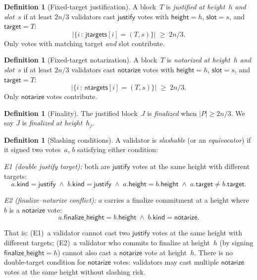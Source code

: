 \ifx\litemode\undefined\documentclass{article}\fi
\newcommand{\target}{\mathsf{target}}
\newcommand{\kind}{\mathsf{kind}}
\newcommand{\height}{\mathsf{height}}
\newcommand{\justify}{\mathsf{justify}}
\newcommand{\notarize}{\mathsf{notarize}}
\theoremstyle{plain}
\theoremstyle{definition}
\newtheorem{definition}[theorem]{Definition}
\theoremstyle{remark}
\begin{document}
\begin{definition}[Fixed-target justification]\label{def:justification}
A block~$T$ is \emph{justified at height~$h$ and slot~$s$} if at least $2n/3$ validators cast $\justify$ votes with $\height = h$, $\mathsf{slot} = s$, and $\target = T$:
\[
  \bigl|\{i \,:\, \mathsf{jtargets}[i] = (T, s)\}\bigr| \;\geq\; 2n/3.
\]
Only votes with matching target \emph{and} slot contribute.
\end{definition}

\begin{definition}[Fixed-target notarization]\label{def:notarization}
A block~$T$ is \emph{notarized at height~$h$ and slot~$s$} if at least $2n/3$ validators cast $\notarize$ votes with $\height = h$, $\mathsf{slot} = s$, and $\target = T$:
\[
  \bigl|\{i \,:\, \mathsf{ntargets}[i] = (T, s)\}\bigr| \;\geq\; 2n/3.
\]
Only $\notarize$ votes contribute.
\end{definition}

\begin{definition}[Finality]\label{def:finality}
The justified block~$J$ is \emph{finalized} when $|P| \geq 2n/3$.
We say $J$ is \emph{finalized at height~$h_j$}.
\end{definition}

\begin{definition}[Slashing conditions]\label{def:slashing}
A validator is \emph{slashable} (or an \emph{equivocator}) if it signed two votes~$a$, $b$ satisfying either condition:

\emph{E1 (double justify target):} both are $\justify$ votes at the same height with different targets:
\[
  a.\kind = \justify
  \;\wedge\;
  b.\kind = \justify
  \;\wedge\;
  a.\height = b.\height
  \;\wedge\;
  a.\target \neq b.\target.
\]

\emph{E2 (finalize--notarize conflict):} $a$ carries a finalize commitment at a height where $b$ is a $\notarize$ vote:
\[
  a.\mathsf{finalize\_height} = b.\height
  \;\wedge\;
  b.\kind = \notarize.
\]

That is: (E1)~a validator cannot cast two $\justify$ votes at the same height with different targets; (E2)~a validator who commits to finalize at height~$h$ (by signing $\mathsf{finalize\_height} = h$) cannot also cast a $\notarize$ vote at height~$h$.
There is no double-target condition for $\notarize$ votes: validators may cast multiple $\notarize$ votes at the same height without slashing risk.
\end{definition}
\end{document}
